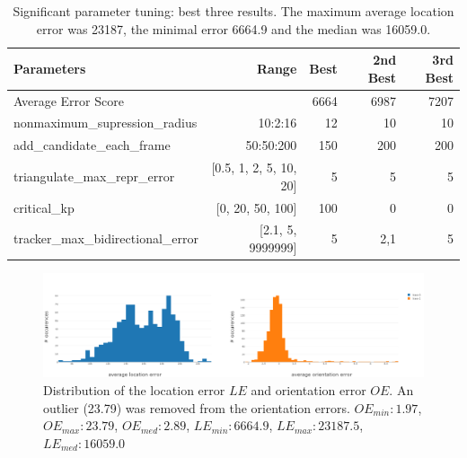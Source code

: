 \begin{table}[]
	\centering
	\caption{Significant parameter tuning: best three results. The maximum average location error was 23187, the minimal error 6664.9 and the median was 16059.0. }
	\label{table:significant-param-tuning}
	\begin{tabular}{lrrrr}
		\hline
		\textbf{Parameters}                &         \textbf{Range} & \textbf{Best} & \textbf{2nd Best} & \textbf{3rd Best} \\ \hline
		Average Error Score                &                        &          6664 &              6987 &              7207 \\ \hline\hline
		nonmaximum\_supression\_radius     &                10:2:16 &            12 &                10 &                10 \\ \hline
		add\_candidate\_each\_frame        &              50:50:200 &           150 &               200 &               200 \\ \hline
		triangulate\_max\_repr\_error      & [0.5, 1, 2, 5, 10, 20] &             5 &                 5 &                 5 \\ \hline
		critical\_kp                       &       [0, 20, 50, 100] &           100 &                 0 &                 0 \\ \hline
		tracker\_max\_bidirectional\_error &      [2.1, 5, 9999999] &             5 &               2,1 &                 5 \\ \hline
	\end{tabular}
\end{table}



\begin{figure}[htp]
	\centering
	\includegraphics[width=1\textwidth]{figures/error_histogram}
	\caption{Distribution of the location error $LE$ and orientation error $OE$. An outlier (23.79) was removed from the orientation errors. 
		$OE_{min}: 1.97$, 
		$OE_{max}: 23.79$,
		$OE_{med}: 2.89$,
		$LE_{min}: 6664.9$,
		$LE_{max}: 23187.5$,
		$LE_{med}: 16059.0$}
	\label{fig:error_histogram}
\end{figure}


